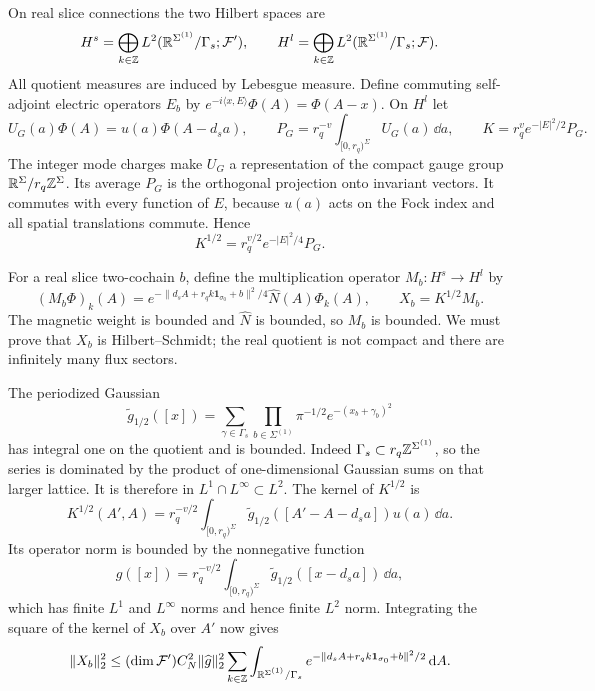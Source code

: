 On real slice connections the two Hilbert spaces are
\[
 H^s=\bigoplus_{k\in\mathbb Z}
      L^2(\mathbb R^{\Sigma^{(1)}}/\Gamma_s;\mathcal F'),\qquad
 H^l=\bigoplus_{k\in\mathbb Z}
      L^2(\mathbb R^{\Sigma^{(1)}}/\Gamma_s;\mathcal F).
\]
All quotient measures are induced by Lebesgue measure. Define commuting
self-adjoint electric operators $E_b$ by
$e^{-i\langle x,E\rangle}\Phi(A)=\Phi(A-x)$. On $H^l$ let
\begin{equation}\label{eq:slab-electric-operators}
 U_G(a)\Phi(A)=u(a)\Phi(A-d_sa),\qquad
 P_G=r_q^{-v}\int_{[0,r_q)^{\Sigma}}U_G(a)\,\dd a,
 \qquad K=r_q^ve^{-|E|^2/2}P_G.
\end{equation}
The integer mode charges make $U_G$ a representation of the compact
gauge group $\mathbb R^{\Sigma}/r_q\mathbb Z^{\Sigma}$. Its average $P_G$ is the
orthogonal projection onto invariant vectors. It commutes with every
function of $E$, because $u(a)$ acts on the Fock index and all spatial
translations commute. Hence
\begin{equation}\label{eq:slab-electric-square-root}
 K^{1/2}=r_q^{v/2}e^{-|E|^2/4}P_G.
\end{equation}

For a real slice two-cochain $b$, define the multiplication operator
$M_b:H^s\to H^l$ by
\begin{equation}\label{eq:slab-magnetic-multiplier}
 (M_b\Phi)_k(A)=
     e^{-\|d_sA+r_qk\mathbf1_{\sigma_0}+b\|^2/4}
                                      \widehat N(A)\Phi_k(A),
 \qquad X_b=K^{1/2}M_b.
\end{equation}
The magnetic weight is bounded and $\widehat N$ is bounded, so $M_b$
is bounded. We must prove that $X_b$ is Hilbert--Schmidt; the real
quotient is not compact and there are infinitely many flux sectors.

The periodized Gaussian
\[
 \widetilde g_{1/2}([x])
   =\sum_{\gamma\in\Gamma_s}\prod_{b\in\Sigma^{(1)}}
                       \pi^{-1/2}e^{-(x_b+\gamma_b)^2}
\]
has integral one on the quotient and is bounded. Indeed
$\Gamma_s\subset r_q\mathbb Z^{\Sigma^{(1)}}$, so the series is dominated
by the product of one-dimensional Gaussian sums on that larger lattice.
It is therefore in $L^1\cap L^\infty\subset L^2$. The kernel of
$K^{1/2}$ is
\[
 K^{1/2}(A',A)=r_q^{-v/2}\int_{[0,r_q)^{\Sigma}}
       \widetilde g_{1/2}([A'-A-d_sa])u(a)\,\dd a.
\]
Its operator norm is bounded by the nonnegative function
\[
 \widehat g([x])=r_q^{-v/2}\int_{[0,r_q)^{\Sigma}}
                  \widetilde g_{1/2}([x-d_sa])\,\dd a,
\]
which has finite $L^1$ and $L^\infty$ norms and hence finite $L^2$ norm.
Integrating the square of the kernel of $X_b$ over $A'$ now gives
\begin{equation}\label{eq:slab-shifted-hs}
 \|X_b\|_2^2\le
    (\dim\mathcal F')C_N^2\|\widehat g\|_2^2
       \sum_{k\in\mathbb Z}\int_{\mathbb R^{\Sigma^{(1)}}/\Gamma_s}
             e^{-\|d_sA+r_qk\mathbf1_{\sigma_0}+b\|^2/2}\,\mathrm d A.
\end{equation}

